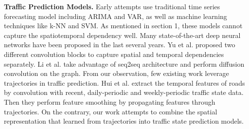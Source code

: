 \vspace{\baselineskip}

\textbf{Traffic Prediction Models.} Early attempts use traditional time series forecasting model including ARIMA\cite{ARIMA_pred} and VAR\cite{var_pred}, as well as machine learning techniques like k-NN\cite{knn_pred} and SVM\cite{svm_pred}. As mentioned in section 1, these models cannot capture the spatiotemporal dependency well. Many state-of-the-art deep neural networks have been proposed in the last several years. Yu et al.\cite{STGCN} proposed two different convolution blocks to capture spatial and temporal dependencies separately. Li et al.\cite{DCRNN} take advantage of seq2seq\cite{seq2seq} architecture and perform diffusion convolution on the graph. From our observation, few existing work leverage trajectories in traffic prediction. Hui et al.\cite{trajnet} extract the temporal features of roads by convolution with recent, daily-periodic and weekly-periodic traffic state data. Then they perform feature smoothing by propagating features through trajectories. On the contrary, our work attempts to combine the spatial representation that learned from trajectories into traffic state prediction models.
